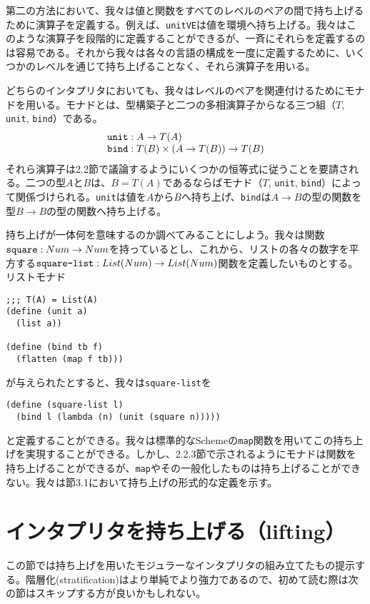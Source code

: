 \documentclass[11pt, oneside]{jsbook}   	%
\begin{document}
第二の方法において、我々は値と関数をすべてのレベルのペアの間で持ち上げるために演算子を定義する。例えば、\verb|unitVE|は値を環境へ持ち上げる。我々はこのような演算子を段階的に定義することができるが、一斉にそれらを定義するのは容易である。それから我々は各々の言語の構成を一度に定義するために、いくつかのレベルを通じて持ち上げることなく、それら演算子を用いる。

どちらのインタプリタにおいても、我々はレベルのペアを関連付けるためにモナドを用いる。モナドとは、型構築子と二つの多相演算子からなる三つ組（$T$, \verb|unit|, \verb|bind|）である。
$$
\begin{array}{l}
\verb|unit| : A \rightarrow T(A) \\
\verb|bind| : T(B) \times (A \rightarrow T(B)) \rightarrow T(B)
\end{array}
$$
それら演算子は2.2節で議論するようにいくつかの恒等式に従うことを要請される。二つの型$A$と$B$は、$B = T(A)$であるならばモナド（$T$, \verb|unit|, \verb|bind|）によって関係づけられる。\verb|unit|は値を$A$から$B$へ持ち上げ、\verb|bind|は$A \rightarrow B$の型の関数を型$B \rightarrow B$の型の関数へ持ち上げる。

持ち上げが一体何を意味するのか調べてみることにしよう。我々は関数$\verb|square|:Num \rightarrow Num$を持っているとし、これから、リストの各々の数字を平方する$\verb|square-list|:List(Num) \rightarrow List(Num)$関数を定義したいものとする。リストモナド
\begin{lstlisting}
;;; T(A) = List(A)
(define (unit a)
  (list a))

(define (bind tb f)
  (flatten (map f tb)))
\end{lstlisting}
が与えられたとすると、我々は\verb|square-list|を
\begin{lstlisting}
(define (square-list l)
  (bind l (lambda (n) (unit (square n)))))
\end{lstlisting}
と定義することができる。我々は標準的なSchemeの\verb|map|関数を用いてこの持ち上げを実現することができる。しかし、2.2.3節で示されるようにモナドは関数を持ち上げることができるが、\verb|map|やその一般化したものは持ち上げることができない。我々は節3.1において持ち上げの形式的な定義を示す。
\section{インタプリタを持ち上げる（lifting）}
この節では持ち上げを用いたモジュラーなインタプリタの組み立てたもの提示する。階層化(stratification)はより単純でより強力であるので、初めて読む際は次の節はスキップする方が良いかもしれない。
\end{document}
